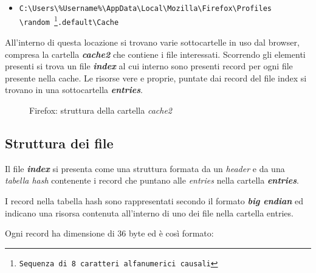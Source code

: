 \begin{itemize}
	\item{\texttt{C:\textbackslash Users\textbackslash\%Username\%\textbackslash AppData\textbackslash Local\textbackslash Mozilla\textbackslash Firefox\textbackslash Profiles\\\textbackslash random \footnote{Sequenza di 8 caratteri alfanumerici causali}.default\textbackslash Cache}}
\end{itemize}

All'interno di questa locazione si trovano varie sottocartelle in uso dal browser, compresa la cartella \textbf{\textit{cache2}} che contiene i file interessati. Scorrendo gli elementi presenti si trova un file \textbf{\textit{index}} al cui interno sono presenti record per ogni file presente nella cache. Le risorse vere e proprie, puntate dai record del file index si trovano in una sottocartella \textbf{\textit{entries}}.

\begin{figure}[h]
	\centering
	\begin{minipage}[c]{0.7\textwidth}
	\end{minipage}
	\caption{Firefox: struttura della cartella \textit{cache2}}
\end{figure}

\subsection{Struttura dei file}

Il file \textbf{\textit{index}} si presenta come una struttura formata da un \textit{header} e da una \textit{tabella hash} contenente i record che puntano alle \textit{entries} nella cartella \textbf{\textit{entries}}. \nocite{Habben}

I record nella tabella hash sono rappresentati secondo il formato \textbf{\textit{big endian}} ed indicano una risorsa contenuta all'interno di uno dei file nella cartella entries. 
\clearpage

Ogni record ha dimensione di 36 byte ed è così formato:


